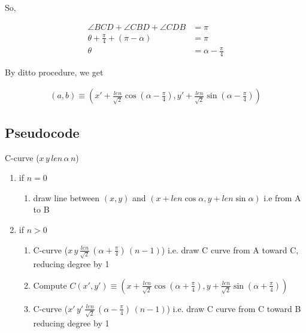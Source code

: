 \documentclass{article}
\begin{document}
So, 

\begin{align*}
    \angle BCD + \angle CBD + \angle CDB &= \pi\\
    \theta + \frac{\pi}{4} + (\pi - \alpha) &= \pi\\
    \theta &= \alpha - \frac{\pi}{4}
\end{align*}

By ditto procedure, we get

\begin{align*}
    (a, b) \equiv \left(x' +\frac{len }{\sqrt{2}} \cos (\alpha - \frac{\pi}{4}), y' + \frac{len}{\sqrt{2}} \sin (\alpha - \frac{\pi}{4})\right)
\end{align*}

\subsection{Pseudocode}
C-curve (\(x \, y \, len \, \alpha \, n\))

\begin{enumerate}
    \item if \(n=0\) \begin{enumerate}
        \item draw line between \((x, y)\) and \((x+len \cos \alpha, y + len \sin \alpha)\) i.e from A to B
    \end{enumerate}
    \item if \(n > 0\) \begin{enumerate}
        \item C-curve (\(x \, y \, \frac{len}{\sqrt{2}} \, (\alpha + \frac{\pi}{4}) \, (n-1)\)) i.e. draw C curve from A toward C, reducing degree by 1
        \item Compute \(C (x', y') \equiv \left(x+\frac{len }{\sqrt{2}} \cos (\alpha + \frac{\pi}{4}), y + \frac{len}{\sqrt{2}} \sin (\alpha + \frac{\pi}{4})\right)\)
        \item C-curve (\(x' \, y' \, \frac{len}{\sqrt{2}} \, (\alpha - \frac{\pi}{4}) \, (n-1)\)) i.e. draw C curve from C toward B reducing degree by 1
    \end{enumerate}
\end{enumerate}
\end{document}
